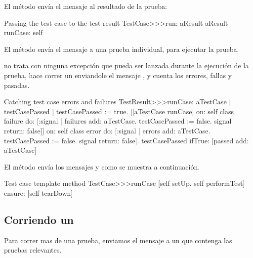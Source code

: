 \documentclass[a4paper,10pt,twoside]{book}
\begin{document}

El m\'etodo 
 env\'ia el mensaje
 al resultado de la prueba:

\begin{method}[testcaserun:]{Passing the test case to the test result}
TestCase>>>run: aResult
	aResult runCase: self
\end{method}

El m\'etodo  env\'ia
el mensaje  a una prueba individual, para ejecutar la prueba.

 no trata con ninguna excepci\'on que pueda ser
lanzada durante la ejecuci\'on de la prueba, hace correr un enviandole el mensaje
, y cuenta los errores, fallas y pasadas.

\begin{method}[testresultruncase]{Catching test case errors and failures}
TestResult>>>runCase: aTestCase
	| testCasePassed |
	testCasePassed := true.
	[[aTestCase runCase] 
			on: self class failure
			do: 
				[:signal | 
				failures add: aTestCase.
				testCasePassed := false.
				signal return: false]]
					on: self class error
					do:
						[:signal |
						errors add: aTestCase.
						testCasePassed := false.
						signal return: false].
	testCasePassed ifTrue: [passed add: aTestCase]
\end{method}

El m\'etodo   env\'ia  los mensajes  y 
como se muestra a continuaci\'on. 

\begin{method}[testcaseruncase]{Test case template method}
TestCase>>>runCase
	[self setUp.
	self performTest] ensure: [self tearDown]
\end{method}

\subsection{Corriendo un }

Para correr mas de una prueba, enviamos el mensaje  a un  que contenga
las pruebas relevantes.
\end{document}
